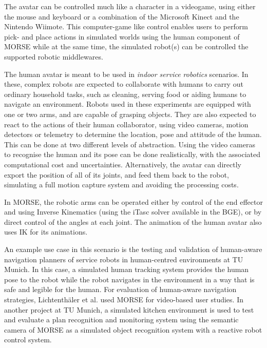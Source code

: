 \documentclass{llncs}
\begin{document}
The avatar can be controlled much like a character in a videogame, using either
the mouse and keyboard or a combination of the Microsoft Kinect and the
Nintendo Wiimote. This computer-game like control enables users to perform
pick- and place actions in simulated worlds using the human component of MORSE
while at the same time, the simulated robot(s) can be controlled the supported
robotic middlewares.


The human avatar is meant to be used in \emph{indoor service robotics} scenarios.
In these, complex robots are expected to collaborate with humans to carry out
ordinary household tasks, such as cleaning, serving food or aiding humans to
navigate an environment.
Robots used in these experiments are equipped with one or two arms, and are
capable of grasping objects. They are also expected to react to the actions of
their human collaborator, using video cameras, motion detectors or telemetry to
determine the location, pose and attitude of the human.
This can be done at two different levels of
abstraction. Using the video cameras to recognise the human and its pose can be
done realistically, with the associated computational cost and uncertainties.
Alternatively, the avatar can directly export the position of all of its
joints, and feed them back to the robot, simulating a full motion capture
system and avoiding the processing costs.


In MORSE, the robotic arms can be operated either by control of the end
effector and using Inverse Kinematics (using the iTasc \cite{iTaSC} solver
available in the BGE), or by direct control of the angles at each joint.
The animation of the human avatar also uses IK for its animations.

An example use case in this scenario is the testing and validation of human-aware
navigation planners of service robots in human-centred environments at TU Munich. 
In this case, a simulated human tracking system provides the human pose to the robot
while the robot navigates in the environment in a way that is safe and legible
for the human. For evaluation of human-aware navigation strategies, 
Lichtenth{\"a}ler et al. \cite{lichtenthaeler2012increasing} used MORSE for 
video-based user studies. 
In another project at TU Munich, a simulated kitchen environment is used
to test and evaluate a plan recognition and monitoring system using the 
semantic camera of MORSE as a simulated object recognition system with 
a reactive robot control system.
\end{document}
